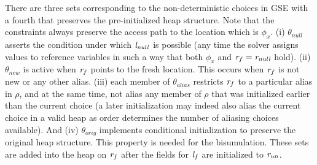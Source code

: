 There are three sets corresponding to the non-deterministic choices in
GSE with a fourth that preserves the pre-initialized heap structure.
Note that the constraints always preserve the access path to the location which is $\phi_x$.
(i) $\theta_\mathit{null}$ asserts the condition under which
$\emph{l}_\mathit{null}$ is possible (any time the solver assigns
values to reference variables in such a way that both $\phi_x$ and $\emph{r}_f =
\emph{r}_\mathit{null}$ hold). (ii)
$\theta_\mathit{new}$ is active when $\emph{r}_f$ points to the
fresh location. This occurs when $\emph{r}_f$ is not new or any other alias. (iii) each member of $\theta_\mathit{alias}$ restricts $\emph{r}_f$ to
a particular alias in $\rho$, and at the same time, not alias any member of $\rho$
that was initialized earlier than the current choice (a later
initialization may indeed also alias the current choice in a valid
heap as order determines the number of aliasing choices available). And (iv) $\theta_\mathit{orig}$  implements conditional initialization to preserve the
original heap structure. This property is needed for the bisumulation. 
These sets are added into the heap on $\emph{r}_f$ after the fields for $\emph{l}_f$ are initialized to $\emph{r}_\mathit{un}$.


\begin{comment} where for each element in the set $(\cfgnt{r}_a\ \cfgnt{l}_a)
\in \rho$ it creates a constraint stating that $\cfgnt{r}_f$ is not null, points to
$\cfgnt{r}_a$, and does not point to any reference contained in $(\cfgnt{r}_a^\prime\ 
\cfgnt{l}_a^\prime) \in \rho$ such that $\cfgnt{r}_a < \cfgnt{r}_a^\prime$ based on a lexical
ordering of initialized references. Additionally,
$\theta_\mathit{orig}$ allows for the possibility that the field
continues to remain uninitialized since the heap is symbolic.
\sjp{The last statement seems to jump out since we have not been
talking about the heap being symbolic (have we?)} We refer
to initialization in the summary machine as conditional
initialization \sjp{Not sure why we say this - what does it mean
to the reader?}. Finally, the fields of the reference $\cfgnt{r}_f$ are marked
as uninitialized. In the post condition of the rule, the reference
$\cfgnt{r}_f$ points to $\theta$ which contains the union of all the
constraint location pairs sets, and the field $f$ points to the new
reference $\cfgnt{r}_f$ in the summary heap.
\end{comment}

\begin{comment}
 Note that the summarize rule invoked repeatedly until
the set of unitialized constraint location pairs for field $f$ is
empty. In other words the set $\Lambda$ is empty. This consititutes
the summarize end rule in~\figref{fig:symInit}.
\end{comment}

